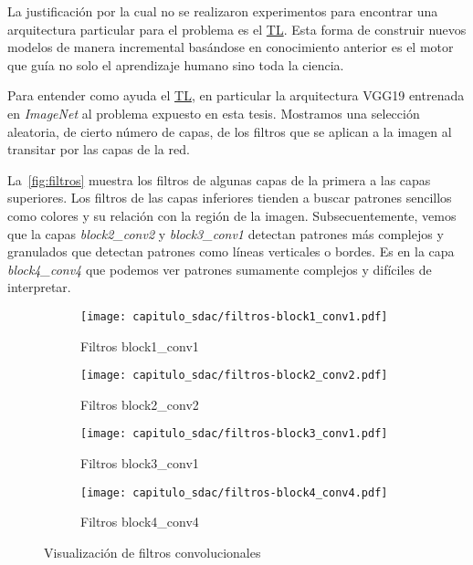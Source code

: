 La justificación por la cual no se realizaron experimentos para encontrar una
arquitectura particular para el problema es el \hyperlink{abbr}{TL}. Esta forma de
construir nuevos modelos de manera incremental basándose en conocimiento
anterior es el motor que guía no solo el aprendizaje humano sino toda la
ciencia.

Para entender como ayuda el \hyperlink{abbr}{TL}, en particular la arquitectura
VGG19 entrenada en \emph{ImageNet} al problema expuesto en esta tesis. Mostramos
una selección aleatoria, de cierto número de capas, de los filtros que se
aplican a la imagen al transitar por las capas de la red. 

La~\autoref{fig:filtros} muestra los filtros de algunas capas de la primera a
las capas superiores. Los filtros de las capas inferiores tienden a buscar
patrones sencillos como colores y su relación con la región de la imagen.
Subsecuentemente, vemos que la capas \emph{block2\_conv2} y \emph{block3\_conv1}
detectan patrones más complejos y granulados que detectan patrones como líneas
verticales o bordes. Es en la capa \emph{block4\_conv4} que podemos ver patrones
sumamente complejos y difíciles de interpretar.

\begin{figure}[H] 
  \begin{subfigure}[b]{0.5\linewidth}
    \centering
    \texttt{[image: capitulo\_sdac/filtros-block1\_conv1.pdf]} 
    \caption{Filtros block1\_conv1}\label{fig7:aa}
    \vspace{4ex}
  \end{subfigure}%
  \begin{subfigure}[b]{0.5\linewidth}
    \centering
    \texttt{[image: capitulo\_sdac/filtros-block2\_conv2.pdf]} 
    \caption{Filtros block2\_conv2}\label{fig7:bb}
    \vspace{4ex}
  \end{subfigure} 
  \begin{subfigure}[b]{0.5\linewidth}
    \centering
    \texttt{[image: capitulo\_sdac/filtros-block3\_conv1.pdf]} 
    \caption{Filtros block3\_conv1}\label{fig7:cc}
  \end{subfigure}%
  \begin{subfigure}[b]{0.5\linewidth}
    \centering
    \texttt{[image: capitulo\_sdac/filtros-block4\_conv4.pdf]} 
    \caption{Filtros block4\_conv4}\label{fig7:dd}
  \end{subfigure} 
  \caption{Visualización de filtros convolucionales}\label{fig:filtros} 
\end{figure}

